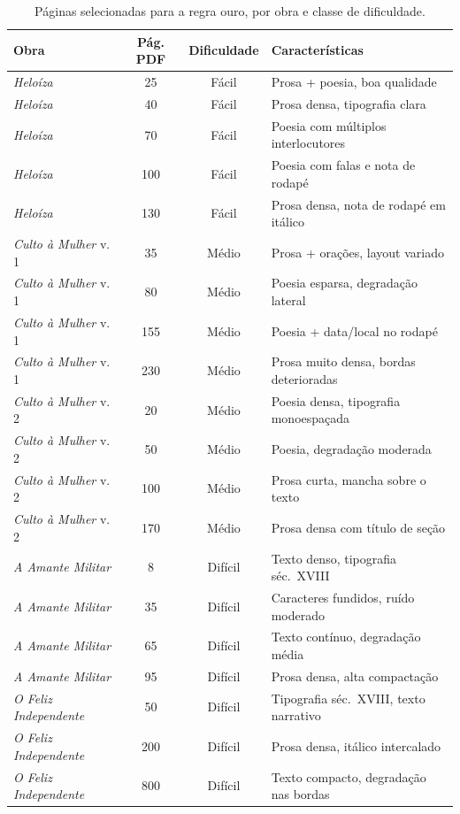 \documentclass[
  12pt,
  oneside,
  a4paper,
  chapter=TITLE,
  section=TITLE,
  english,
  brazil
]{abntex2}
\begin{document}
\begin{table}[H]
\centering
\caption{Páginas selecionadas para a regra ouro, por obra e classe de dificuldade.}
\label{tab:paginas_corpus}
\renewcommand{\arraystretch}{1.3}
\begin{tabular}{p{4.5cm} c c p{5cm}}
\hline
\textbf{Obra} & \textbf{Pág. PDF} & \textbf{Dificuldade} & \textbf{Características} \\
\hline
\textit{Heloíza}              & 25  & Fácil   & Prosa + poesia, boa qualidade \\
\textit{Heloíza}              & 40  & Fácil   & Prosa densa, tipografia clara \\
\textit{Heloíza}              & 70  & Fácil   & Poesia com múltiplos interlocutores \\
\textit{Heloíza}              & 100 & Fácil   & Poesia com falas e nota de rodapé \\
\textit{Heloíza}              & 130 & Fácil   & Prosa densa, nota de rodapé em itálico \\
\hline
\textit{Culto à Mulher} v.\,1 & 35  & Médio   & Prosa + orações, layout variado \\
\textit{Culto à Mulher} v.\,1 & 80  & Médio   & Poesia esparsa, degradação lateral \\
\textit{Culto à Mulher} v.\,1 & 155 & Médio   & Poesia + data/local no rodapé \\
\textit{Culto à Mulher} v.\,1 & 230 & Médio   & Prosa muito densa, bordas deterioradas \\
\textit{Culto à Mulher} v.\,2 & 20  & Médio   & Poesia densa, tipografia monoespaçada \\
\textit{Culto à Mulher} v.\,2 & 50  & Médio   & Poesia, degradação moderada \\
\textit{Culto à Mulher} v.\,2 & 100 & Médio   & Prosa curta, mancha sobre o texto \\
\textit{Culto à Mulher} v.\,2 & 170 & Médio   & Prosa densa com título de seção \\
\hline
\textit{A Amante Militar}     & 8   & Difícil & Texto denso, tipografia séc.\ XVIII \\
\textit{A Amante Militar}     & 35  & Difícil & Caracteres fundidos, ruído moderado \\
\textit{A Amante Militar}     & 65  & Difícil & Texto contínuo, degradação média \\
\textit{A Amante Militar}     & 95  & Difícil & Prosa densa, alta compactação \\
\textit{O Feliz Independente} & 50  & Difícil & Tipografia séc.\ XVIII, texto narrativo \\
\textit{O Feliz Independente} & 200 & Difícil & Prosa densa, itálico intercalado \\
\textit{O Feliz Independente} & 800 & Difícil & Texto compacto, degradação nas bordas \\
\hline
\end{tabular}
\end{table}
\end{document}
